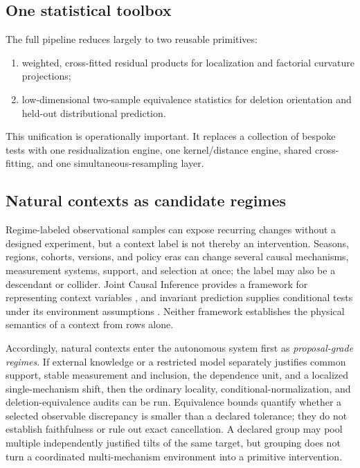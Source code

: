 \documentclass[11pt]{article}
\begin{document}
\subsection{One statistical toolbox}

The full pipeline reduces largely to two reusable primitives:
\begin{enumerate}
\item weighted, cross-fitted residual products for localization and factorial curvature projections;
\item low-dimensional two-sample equivalence statistics for deletion orientation and held-out distributional prediction.
\end{enumerate}
This unification is operationally important.  It replaces a collection of bespoke tests with one residualization engine, one kernel/distance engine, shared cross-fitting, and one simultaneous-resampling layer.

\subsection{Natural contexts as candidate regimes}
\label{sec:natural-contexts}

Regime-labeled observational samples can expose recurring changes without a
designed experiment, but a context label is not thereby an intervention.
Seasons, regions, cohorts, versions, and policy eras can change several causal
mechanisms, measurement systems, support, and selection at once; the label may
also be a descendant or collider.  Joint Causal Inference provides a framework
for representing context variables \citep{mooij2020jci}, and invariant
prediction supplies conditional tests under its environment assumptions
\citep{peters2016icp}.  Neither framework establishes the physical semantics
of a context from rows alone.

Accordingly, natural contexts enter the autonomous system first as
\emph{proposal-grade regimes}.  If external knowledge or a restricted model
separately justifies common support, stable measurement and inclusion, the
dependence unit, and a localized single-mechanism shift, then the ordinary
locality, conditional-normalization, and deletion-equivalence audits can be
run.  Equivalence bounds quantify whether a selected observable discrepancy is
smaller than a declared tolerance; they do not establish faithfulness or rule
out exact cancellation.  A declared group may pool multiple independently
justified tilts of the same target, but grouping does not turn a coordinated
multi-mechanism environment into a primitive intervention.
\end{document}
